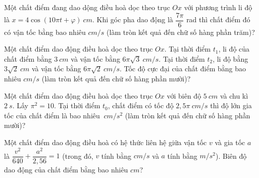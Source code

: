 \begin{ex}
Một chất điểm đang dao dộng điều hoà dọc theo trục $O x$ với phương trình li độ là $x=4 \cos (10 \pi t+\varphi)\ cm$. Khi góc pha dao động là $\dfrac{7 \pi}{6}$ rad thì chất điểm đó có vận tốc bằng bao nhiêu $cm/s$ (làm tròn kết quả đến chữ số hàng phần trăm)?
\end{ex} 


\begin{ex}
Một chất điểm dao động điều hoà dọc theo trục $O x$. Tại thời điểm $t_1$, li độ của chất điểm bằng $3 \ cm$ và vận tốc bằng $6 \pi \sqrt{3} \ cm/s$. Tại thời điểm $t_2$, li độ bằng $3 \sqrt{2} \ cm$ và vận tốc bằng $6 \pi \sqrt{2} \ cm/s$. Tốc độ cực đại của chất điểm bằng bao nhiêu $cm/s$ (làm tròn kết quả đến chữ số hàng phần mười)?
\end{ex} 

\begin{ex}
Một chất điểm dao động điều hoà dọc theo trục $O x$ với biên độ $5 \ cm$ và chu kì $2 \ s$. Lấy $\pi^2=10$. Tại thời điểm $t_0$, chất điểm có tốc độ $2,5 \pi\ cm/s$ thì độ lớn gia tốc của chất điểm là bao nhiêu $\ cm/s^2$ (làm tròn kết quả đến chữ số hàng phần mười)?
 
\end{ex} 

\begin{ex}
Một chất điểm dao động điều hoà có hệ thức liên hệ giữa vận tốc $v$ và gia tốc $a$ là $\dfrac{v^2}{640}+\dfrac{a^2}{2,56}=1$ (trong đó, $v$ tính bằng $cm/s$ và $a$ tính bằng $m/s^2$). Biên độ dao động của chất điểm bằng bao nhiêu $cm$?
\end{ex} 